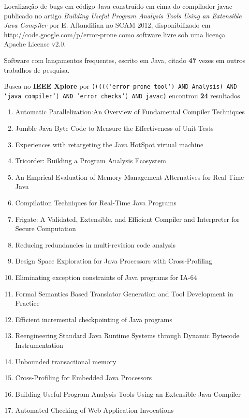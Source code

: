 Localização de bugs em código Java construído em cima do compilador javac
publicado no artigo {\it Building Useful Program Analysis Tools Using an Extensible Java Compiler}
por E. Aftandilian
no SCAM 2012,
disponibilizado em \url{http://code.google.com/p/error-prone}
como software livre
sob uma licença Apache License v2.0.

Software com lançamentos frequentes,
escrito em Java,
citado {\bf 47} vezes em outros trabalhos de pesquisa.

Busca no {\bf IEEE Xplore} por
\texttt{((((('error-prone tool') AND Analysis) AND 'java compiler') AND 'error checks') AND javac)}
encontrou {\bf 24}
resultados.

\begin{enumerate}
\item Automatic Parallelization:An Overview of Fundamental Compiler Techniques
\item Jumble Java Byte Code to Measure the Effectiveness of Unit Tests
\item Experiences with retargeting the Java HotSpot virtual machine
\item Tricorder: Building a Program Analysis Ecosystem
\item An Emprical Evaluation of Memory Management Alternatives for Real-Time Java
\item Compilation Techniques for Real-Time Java Programs
\item Frigate: A Validated, Extensible, and Efficient Compiler and Interpreter for Secure Computation
\item Reducing redundancies in multi-revision code analysis
\item Design Space Exploration for Java Processors with Cross-Profiling
\item Eliminating exception constraints of Java programs for IA-64
\item Formal Semantics Based Translator Generation and Tool Development in Practice
\item Efficient incremental checkpointing of Java programs
\item Reengineering Standard Java Runtime Systems through Dynamic Bytecode Instrumentation
\item Unbounded transactional memory
\item Cross-Profiling for Embedded Java Processors
\item Building Useful Program Analysis Tools Using an Extensible Java Compiler
\item Automated Checking of Web Application Invocations

\end{enumerate}

